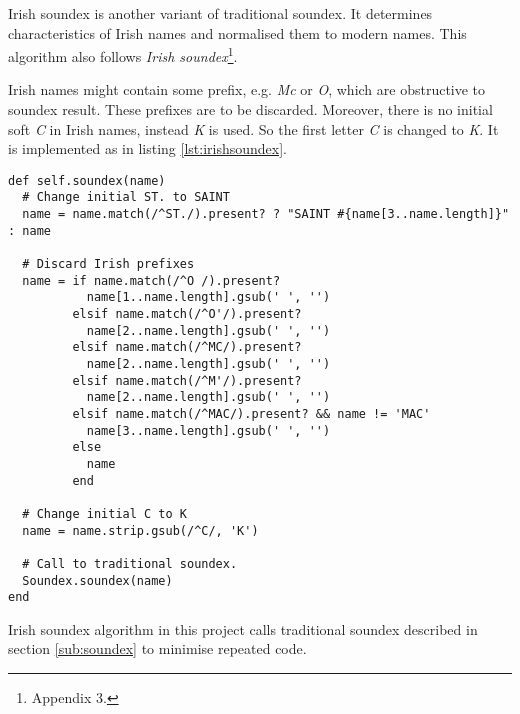 Irish soundex is another variant of traditional soundex. It determines
characteristics of Irish names and normalised them to modern names.
This algorithm also follows \citeauthor{adamw}
\emph{Irish soundex}\footnote{\cite{adamw} Appendix 3.}.

Irish names might contain some prefix, e.g. \emph{Mc} or \emph{O},
which are obstructive to soundex result. These prefixes are to be
discarded. Moreover, there is no initial soft \emph{C} in Irish names,
instead \emph{K} is used. So the first letter \emph{C} is changed to \emph{K}.
It is implemented as in listing \ref{lst:irishsoundex}.

\begin{minipage}{\linewidth}
\begin{lstlisting}[label={lst:irishsoundex}, caption={Irish soundex implementation.}]
def self.soundex(name)
  # Change initial ST. to SAINT
  name = name.match(/^ST./).present? ? "SAINT #{name[3..name.length]}" : name

  # Discard Irish prefixes
  name = if name.match(/^O /).present?
           name[1..name.length].gsub(' ', '')
         elsif name.match(/^O'/).present?
           name[2..name.length].gsub(' ', '')
         elsif name.match(/^MC/).present?
           name[2..name.length].gsub(' ', '')
         elsif name.match(/^M'/).present?
           name[2..name.length].gsub(' ', '')
         elsif name.match(/^MAC/).present? && name != 'MAC'
           name[3..name.length].gsub(' ', '')
         else
           name
         end

  # Change initial C to K
  name = name.strip.gsub(/^C/, 'K')

  # Call to traditional soundex.
  Soundex.soundex(name)
end
\end{lstlisting}
\end{minipage}

Irish soundex algorithm in this project calls traditional soundex
described in section \ref{sub:soundex} to minimise repeated code.

